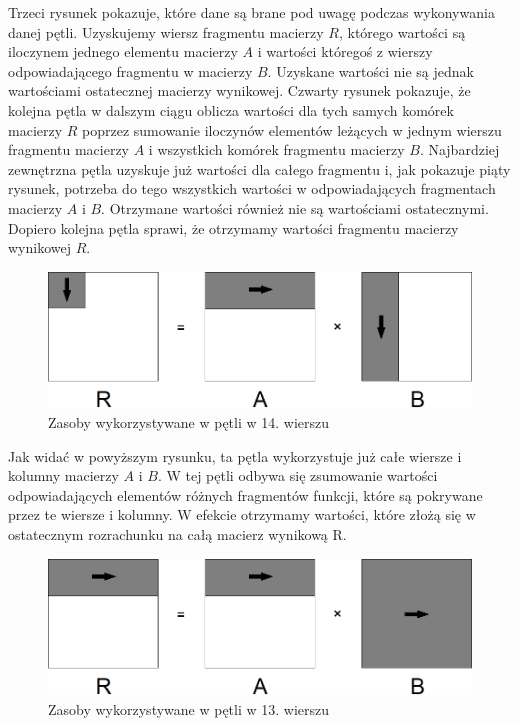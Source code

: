 \documentclass{article}
\begin{document}
Trzeci rysunek pokazuje, które dane są brane pod uwagę podczas wykonywania danej pętli. Uzyskujemy wiersz fragmentu macierzy $R$, którego wartości są iloczynem jednego elementu macierzy $A$ i wartości któregoś z wierszy odpowiadającego fragmentu w macierzy $B$. Uzyskane wartości nie są jednak wartościami ostatecznej macierzy wynikowej. Czwarty rysunek pokazuje, że kolejna pętla w dalszym ciągu oblicza wartości dla tych samych komórek macierzy $R$ poprzez sumowanie iloczynów elementów leżących w jednym wierszu fragmentu macierzy $A$ i wszystkich komórek fragmentu macierzy $B$. Najbardziej zewnętrzna pętla uzyskuje już wartości dla całego fragmentu i, jak pokazuje piąty rysunek, potrzeba do tego wszystkich wartości w odpowiadających fragmentach macierzy $A$ i $B$. Otrzymane wartości również nie są wartościami ostatecznymi. Dopiero kolejna pętla sprawi, że otrzymamy wartości fragmentu macierzy wynikowej $R$.

\begin{figure}[H]
	\centering
	\includegraphics[width=\linewidth]{./images/6/lokMed.png}
	\caption{Zasoby wykorzystywane w pętli w 14. wierszu}
	\label{fig:6medium}
\end{figure}

Jak widać w powyższym rysunku, ta pętla wykorzystuje już całe wiersze i kolumny macierzy $A$ i $B$. W tej pętli odbywa się zsumowanie wartości odpowiadających elementów różnych fragmentów funkcji, które są pokrywane przez te wiersze i kolumny. W efekcie otrzymamy wartości, które złożą się w ostatecznym rozrachunku na całą macierz wynikową R.

\begin{figure}[H]
	\centering
	\includegraphics[width=\linewidth]{./images/6/lokOut1.png}
	\caption{Zasoby wykorzystywane w pętli w 13. wierszu}
	\label{fig:6outer1}
\end{figure}
\end{document}
